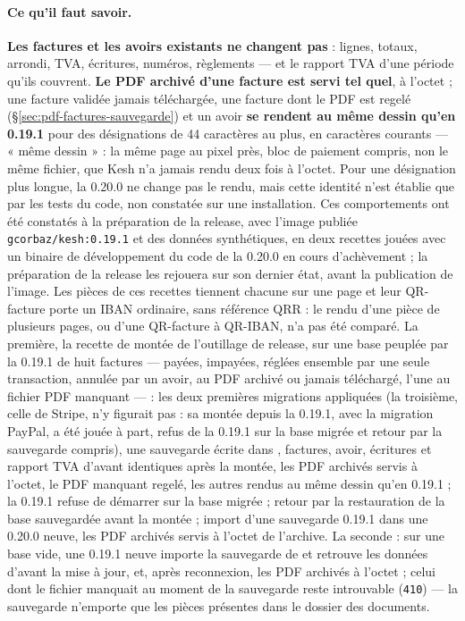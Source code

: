 \documentclass[a4paper,11pt,oneside]{article}
\begin{document}
\paragraph{Ce qu'il faut savoir.} \textbf{Les factures et les avoirs existants ne changent pas} : lignes, totaux, arrondi, TVA, écritures, numéros, règlements --- et le rapport TVA d'une période qu'ils couvrent. \textbf{Le PDF archivé d'une facture est servi tel quel}, à l'octet ; une facture validée jamais téléchargée, une facture dont le PDF est regelé (\S\ref{sec:pdf-factures-sauvegarde}) et un avoir \textbf{se rendent au même dessin qu'en 0.19.1} pour des désignations de 44 caractères au plus, en caractères courants --- « même dessin » : la même page au pixel près, bloc de paiement compris, non le même fichier, que Kesh n'a jamais rendu deux fois à l'octet. Pour une désignation plus longue, la 0.20.0 ne change pas le rendu, mais cette identité n'est établie que par les tests du code, non constatée sur une installation. Ces comportements ont été constatés à la préparation de la release, avec l'image publiée \texttt{gcorbaz/kesh:0.19.1} et des données synthétiques, en deux recettes jouées avec un binaire de développement du code de la 0.20.0 en cours d'achèvement ; la préparation de la release les rejouera sur son dernier état, avant la publication de l'image. Les pièces de ces recettes tiennent chacune sur une page et leur QR-facture porte un IBAN ordinaire, sans référence QRR : le rendu d'une pièce de plusieurs pages, ou d'une QR-facture à QR-IBAN, n'a pas été comparé. La première, la recette de montée de l'outillage de release, sur une base peuplée par la 0.19.1 de huit factures --- payées, impayées, réglées ensemble par une seule transaction, annulée par un avoir, au PDF archivé ou jamais téléchargé, l'une au fichier PDF manquant --- : les deux premières migrations appliquées (la troisième, celle de Stripe, n'y figurait pas : sa montée depuis la 0.19.1, avec la migration PayPal, a été jouée à part, refus de la 0.19.1 sur la base migrée et retour par la sauvegarde compris), une sauvegarde écrite dans , factures, avoir, écritures et rapport TVA d'avant identiques après la montée, les PDF archivés servis à l'octet, le PDF manquant regelé, les autres rendus au même dessin qu'en 0.19.1 ; la 0.19.1 refuse de démarrer sur la base migrée ; retour par la restauration de la base sauvegardée avant la montée ; import d'une sauvegarde 0.19.1 dans une 0.20.0 neuve, les PDF archivés servis à l'octet de l'archive. La seconde : sur une base vide, une 0.19.1 neuve importe la sauvegarde de  et retrouve les données d'avant la mise à jour, et, après reconnexion, les PDF archivés à l'octet ; celui dont le fichier manquait au moment de la sauvegarde reste introuvable (\texttt{410}) --- la sauvegarde n'emporte que les pièces présentes dans le dossier des documents.
\end{document}
